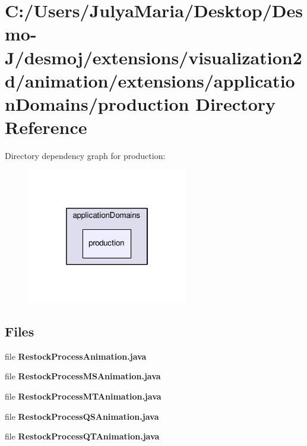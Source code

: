 \section{C\-:/\-Users/\-Julya\-Maria/\-Desktop/\-Desmo-\/\-J/desmoj/extensions/visualization2d/animation/extensions/application\-Domains/production Directory Reference}
\label{dir_3ca5e69d82c16126d79fe8cef0b15b65}
Directory dependency graph for production\-:
\nopagebreak
\begin{figure}[H]
\begin{center}
\leavevmode
\includegraphics[width=198pt]{dir_3ca5e69d82c16126d79fe8cef0b15b65_dep}
\end{center}
\end{figure}
\subsection*{Files}
\begin{DoxyCompactItemize}
\item 
file {\bfseries Restock\-Process\-Animation.\-java}
\item 
file {\bfseries Restock\-Process\-M\-S\-Animation.\-java}
\item 
file {\bfseries Restock\-Process\-M\-T\-Animation.\-java}
\item 
file {\bfseries Restock\-Process\-Q\-S\-Animation.\-java}
\item 
file {\bfseries Restock\-Process\-Q\-T\-Animation.\-java}
\end{DoxyCompactItemize}
